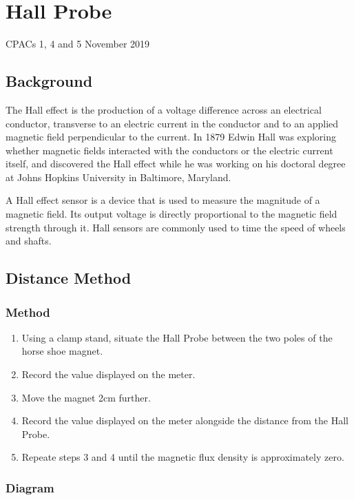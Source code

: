 \section{Hall Probe}
CPACs 1, 4 and 5
\hfill
{} November 2019

\subsection{Background}
The Hall effect is the production of a voltage difference across an electrical conductor, transverse to an electric current in the conductor and to an applied magnetic field perpendicular to the current.
In 1879 Edwin Hall was exploring whether magnetic fields interacted with the conductors or the electric current itself, and discovered the Hall effect while he was working on his doctoral degree at Johns Hopkins University in Baltimore, Maryland. \cite{  wiki:halleffect}
\par
A Hall effect sensor is a device that is used to measure the magnitude of a magnetic field. Its output voltage is directly proportional to the magnetic field strength through it. Hall sensors are commonly used to time the speed of wheels and shafts. \cite{ wiki:sensor}

\subsection{Distance Method}

\subsubsection{Method}
\begin{enumerate}
  \item Using a clamp stand, situate the Hall Probe between the two poles of the horse shoe magnet.
  \item Record the value displayed on the meter.
  \item Move the magnet 2cm further.
  \item Record the value displayed on the meter alongside the distance from the Hall Probe.
  \item Repeate steps 3 and 4  until the magnetic flux density is approximately zero.
\end{enumerate}

\subsubsection{Diagram}
\begin{center}
\end{center}

